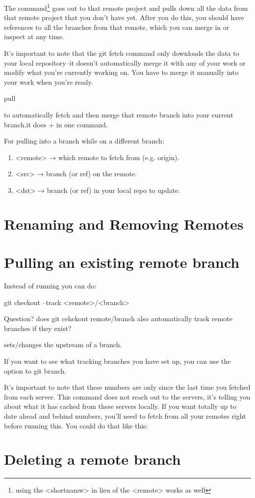 \noindent The command\footnote{using the <shortnamw> in lieu of the <remote> works as well} goes out to that remote project and pulls down all the data from that remote project that you 
don't have yet. After you do this, you should have references to all the branches from that remote, which you can merge in or inspect at any time.

It's important to note that the git fetch command only downloads the data to your local repository--it doesn't automatically merge it with any of your work or modify what you're currently working on. You have to merge it manually into your work when you're ready.

\begin{gitBashBox}
pull
\end{gitBashBox}
to automatically fetch and then merge that remote branch into your current branch.it does  +  in one command.


For pulling into a branch while on a different branch: 
\begin{enumerate}
    \item <remote> → which remote to fetch from (e.g. origin).
    \item <src> → branch (or ref) on the remote.
    \item <dst> → branch (or ref) in your local repo to update.
\end{enumerate}

\section{Renaming and Removing Remotes}

\section{Pulling an existing remote branch}
Instead of running  you can do:
\begin{gitBashBox}
git checkout --track <remote>/<branch>
\end{gitBashBox}
Question? does git cehckout remote/branch also automatically track remote branches if they exist?

 sets/changes the upstream of a branch.

If you want to see what tracking branches you have set up, you can use the  option to git branch. 


It’s important to note that these numbers are only since the last time you fetched from each server. This command does not reach out to the servers, it’s telling you about what it has cached from these servers locally. If you want totally up to date ahead and behind numbers, you’ll need to fetch from all your remotes right before running this. You could do that like this:


\section{Deleting a remote branch}
